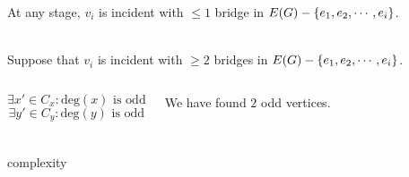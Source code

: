 \begin{frame}{}
  \begin{theorem}
    At any stage, $v_i$ is incident with $\le 1$ bridge in $E(G) - \left\{e_1, e_2, \cdots, e_i\right\}$.
  \end{theorem}

  \pause
  \begin{center}
     \\[6pt]
    Suppose that $v_i$ is incident with $\ge 2$ bridges in $E(G) - \left\{e_1, e_2, \cdots, e_i\right\}$.
  \end{center}

  \pause
  \vspace{0.20cm}
  \begin{columns}
      
      \pause
      \[
	\exists x' \in C_x: \text{deg}(x) \text{ is odd}
      \]
      \pause
      \vspace{-0.60cm}
      \[
	\exists y' \in C_y: \text{deg}(y) \text{ is odd}
      \]

      \begin{center}
	\pause
	We have found $2$ odd vertices. \\[5pt]

	\pause
	 \\[8pt]

	\pause
      \end{center}
  \end{columns}
\end{frame}

\begin{frame}{}
  
\end{frame}

\begin{frame}{}
  complexity
\end{frame}
